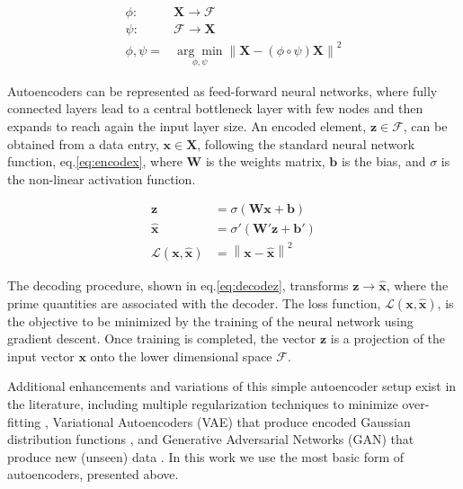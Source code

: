 \documentclass[utf8]{frontiersSCNS} %
\begin{document}
\begin{align}
\phi: & \boldsymbol{X} \rightarrow \boldsymbol{\mathcal{F}} \label{eq:encoder}\\
\psi: & \boldsymbol{\mathcal{F}} \rightarrow \boldsymbol{X} \label{eq:decoder} \\
\phi,\psi = & \underset{\phi,\psi}{\arg \min} \left\lVert \boldsymbol{X} - (\phi \circ \psi) \boldsymbol{X} \right\rVert^2 \label{eq:aeminimization}
\end{align}

Autoencoders can be represented as feed-forward neural networks, where fully connected layers lead to a central bottleneck layer with few nodes and then expands to reach again the input layer size. An encoded element, $\boldsymbol{z} \in \boldsymbol{\mathcal{F}}$, can be obtained from a data entry, $\boldsymbol{x} \in \boldsymbol{X}$, following the standard neural network function, eq.\eqref{eq:encodex}, where $\boldsymbol{W}$ is the weights matrix, $\boldsymbol{b}$ is the bias, and $\sigma$ is the non-linear activation function.

\begin{align}
\boldsymbol{z} & = \sigma \left( \boldsymbol{W}\boldsymbol{x} + \boldsymbol{b} \right) \label{eq:encodex} \\
\boldsymbol{\hat{x}} & = \sigma' \left( \boldsymbol{W'}\boldsymbol{z} + \boldsymbol{b'} \right) \label{eq:decodez} \\ 
\mathcal{L}(\boldsymbol{x}, \boldsymbol{\hat{x}}) & =  \left\lVert \boldsymbol{x}- \boldsymbol{\hat{x}} \right\rVert^2 \label{eq:aeloss}
\end{align}

The decoding procedure, shown in eq.\eqref{eq:decodez}, transforms $\boldsymbol{z}\rightarrow\boldsymbol{\hat{x}}$, where the prime quantities are associated with the decoder. The loss function, $\mathcal{L}(\boldsymbol{x}, \boldsymbol{\hat{x}})$, is the objective to be minimized by the training of the neural network using gradient descent. Once training is completed, the vector $\boldsymbol{z}$ is a projection of the input vector $\boldsymbol{x}$ onto the lower dimensional space $\boldsymbol{\mathcal{F}}$.

Additional enhancements and variations of this simple autoencoder setup exist in the literature, including multiple regularization techniques to minimize over-fitting \citep{7407967}, Variational Autoencoders (VAE) that produce encoded Gaussian distribution functions \citep{Kingma2013}, and Generative Adversarial Networks (GAN) that produce new (unseen) data \citep{Goodfellow2014}. In this work we use the most basic form of autoencoders, presented above.
\end{document}
